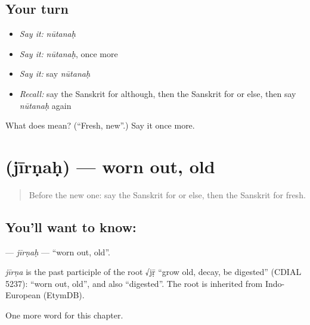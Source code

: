 \subsection*{Your turn}
\begin{itemize}
\raggedright
  \item \emph{Say it:} \emph{nūtanaḥ}
  \item \emph{Say it:} \emph{nūtanaḥ}, once more
  \item \emph{Say it:} say \emph{nūtanaḥ}
  \item \emph{Recall:} say the Sanskrit for although, then the Sanskrit for or else, then say \emph{nūtanaḥ} again
\end{itemize}

\begin{tcolorbox}[breakable,colback=teal!4,colframe=teal!35!black,title={Before you move on}]
What does  mean? (\textquotedblleft{}Fresh, new\textquotedblright{}.) Say it once more.
\end{tcolorbox}
\section[\texorpdfstring{\sk{जीर्णः} (jīrṇaḥ)}{जीर्णः (jīrṇaḥ)}]{ (jīrṇaḥ) — worn out, old}

\label{lesson:SA-C155-jirnah}



\begin{quote}
Before the new one: say the Sanskrit for or else, then the Sanskrit for fresh.
\end{quote}

\subsection*{You'll want to know: }
\textbf{} — \emph{jīrṇaḥ} — \textquotedblleft{}worn out, old\textquotedblright{}.

\begin{cousinweb}
\emph{jīrṇa} is the past participle of the root √jṝ \textquotedblleft{}grow old, decay, be digested\textquotedblright{} (CDIAL 5237): \textquotedblleft{}worn out, old\textquotedblright{}, and also \textquotedblleft{}digested\textquotedblright{}. The root is inherited from Indo-European (EtymDB).
\end{cousinweb}

\begin{grammarlens}[title={What you've built}]
One more word for this chapter.
\end{grammarlens}

